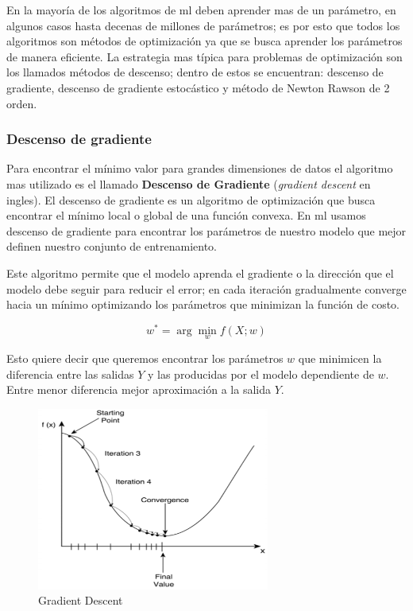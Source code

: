 En la mayoría de los algoritmos de \ac{ml} deben aprender mas de un parámetro, en algunos casos hasta decenas de millones de parámetros; es por esto que todos los algoritmos  son métodos de optimización ya que se busca aprender los parámetros de manera eficiente. La estrategia mas típica para problemas de optimización son los llamados métodos de descenso; dentro de estos se encuentran: descenso de gradiente, descenso de gradiente estocástico y método de Newton Rawson de 2 orden.

\subsubsection{Descenso de gradiente}\label{sub:gradient-desc}
Para encontrar el mínimo valor para grandes dimensiones de datos el algoritmo mas utilizado es el llamado \textbf{Descenso de Gradiente} (\textit{gradient descent} en ingles). El descenso de gradiente es un algoritmo de optimización que busca encontrar el mínimo local o global de una función convexa.  En \ac{ml} usamos descenso de gradiente para encontrar los parámetros de nuestro modelo que mejor definen nuestro conjunto de entrenamiento.

Este algoritmo permite que el modelo aprenda el gradiente o la dirección que el modelo debe seguir para reducir el error; en cada iteración gradualmente converge hacia un mínimo optimizando los parámetros que minimizan la función de costo. 

\begin{equation}
w^* =  \arg\min_{w} f(X; w)
\end{equation}

Esto quiere decir que queremos encontrar los parámetros $w$ que minimicen la diferencia entre las salidas $Y$ y las producidas por el modelo dependiente de $w$. Entre menor  diferencia mejor aproximación a la salida $Y$. 

\begin{figure}[H] \centering
  \includegraphics[height=6cm,keepaspectratio=true,clip=true]{imagenes/MarcoTeorico/gradient-descent.png}
  \caption{Gradient Descent }\label{Fig:gradient-descent}
\end{figure}


